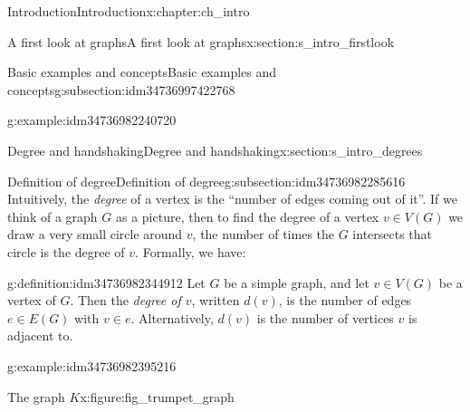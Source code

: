 \documentclass[oneside,10pt,]{book}
\numberwithin{equation}{section}
\begin{document}
\begin{chapterptx}{Introduction}{}{Introduction}{}{}{x:chapter:ch_intro}
\begin{sectionptx}{A first look at graphs}{}{A first look at graphs}{}{}{x:section:s_intro_firstlook}
\begin{subsectionptx}{Basic examples and concepts}{}{Basic examples and concepts}{}{}{g:subsection:idm34736997422768}
\begin{example}{}{g:example:idm34736982240720}
\begin{image}{0.05}{0.9}{0.05}
{
}%
\end{image}%
\end{example}
\end{subsectionptx}
\end{sectionptx}
%
%
\typeout{************************************************}
\typeout{************************************************}
%
\begin{sectionptx}{Degree and handshaking}{}{Degree and handshaking}{}{}{x:section:s_intro_degrees}
%
%
\typeout{************************************************}
\typeout{************************************************}
%
\begin{subsectionptx}{Definition of degree}{}{Definition of degree}{}{}{g:subsection:idm34736982285616}
Intuitively, the \emph{degree} of a vertex is the ``number of edges coming out of it''. If we think of a graph \(G\) as a picture, then to find the degree of a vertex \(v\in V(G)\) we draw a very small circle around \(v\), the number of times the \(G\) intersects that circle is the degree of \(v\).  Formally, we have:%
\begin{definition}{}{g:definition:idm34736982344912}%
Let \(G\) be a simple graph, and let \(v\in V(G)\) be a vertex of \(G\).  Then the \emph{degree of \(v\)}, written \(d(v)\), is the number of edges \(e\in E(G)\) with \(v\in e\). Alternatively, \(d(v)\) is the number of vertices \(v\) is adjacent to.%
\end{definition}
\begin{example}{}{g:example:idm34736982395216}%
\begin{figureptx}{The graph \(K\)}{x:figure:fig_trumpet_graph}{}%
\begin{image}{0.25}{0.5}{0.25}%

\end{image}
\end{figureptx}
\end{example}
\end{subsectionptx}
\end{sectionptx}
\end{chapterptx}
\end{document}
